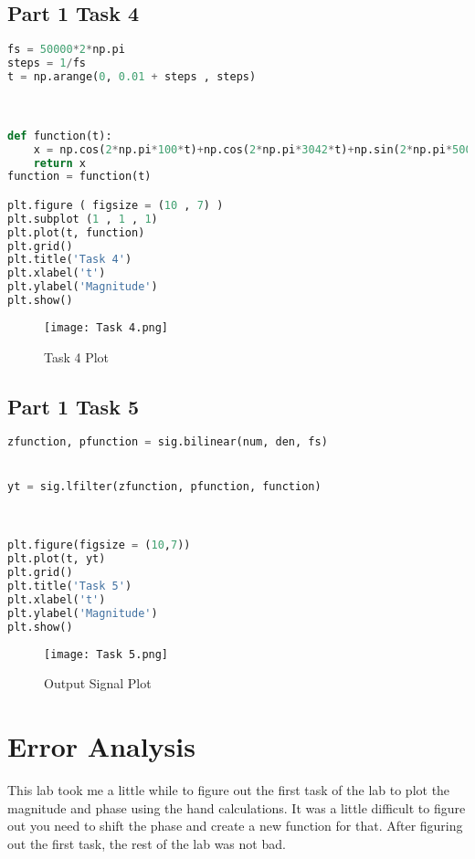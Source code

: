 \documentclass[11pt,a4]{report}
\begin{document}
\subsection{Part 1 Task 4}
\begin{lstlisting}[language=Python]
fs = 50000*2*np.pi
steps = 1/fs
t = np.arange(0, 0.01 + steps , steps)



def function(t):
    x = np.cos(2*np.pi*100*t)+np.cos(2*np.pi*3042*t)+np.sin(2*np.pi*50000*t)
    return x
function = function(t)

plt.figure ( figsize = (10 , 7) )
plt.subplot (1 , 1 , 1)
plt.plot(t, function)
plt.grid()
plt.title('Task 4')
plt.xlabel('t')
plt.ylabel('Magnitude')
plt.show()

\end{lstlisting}

\begin{figure}[h!]
    \begin{center}
  \caption{Task 4 Plot}
  \texttt{[image: Task 4.png]}
\end{center}
\end{figure}

\subsection{Part 1 Task 5}
\begin{lstlisting}[language=Python]
zfunction, pfunction = sig.bilinear(num, den, fs)


yt = sig.lfilter(zfunction, pfunction, function)



plt.figure(figsize = (10,7))
plt.plot(t, yt)
plt.grid()
plt.title('Task 5')
plt.xlabel('t')
plt.ylabel('Magnitude')
plt.show()
\end{lstlisting}
\newpage
\begin{figure}[h!]
    \begin{center}
  \caption{Output Signal Plot}
  \texttt{[image: Task 5.png]}
\end{center}
\end{figure}



\section{Error Analysis}
This lab took me a little while to figure out the first task of the lab to plot the magnitude and phase using the hand calculations. It was a little difficult to figure out you need to shift the phase and create a new function for that. After figuring out the first task, the rest of the lab was not bad. 
\end{document}
